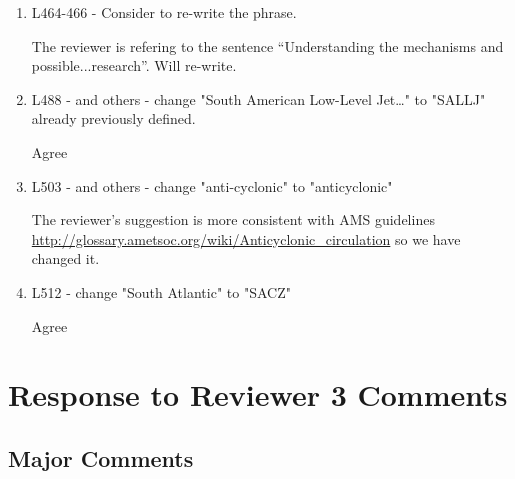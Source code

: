 \documentclass{article}
\newenvironment{answer}{\begin{mdframed}}{\end{mdframed}}
\begin{document}
\begin{enumerate}
	\item L464-466 - Consider to re-write the phrase.
	\begin{answer}
		The reviewer is refering to the sentence ``Understanding the mechanisms and possible...research''.
		Will re-write.
	\end{answer}
	\item L488 - and others - change "South American Low-Level Jet…" to "SALLJ" already previously defined.
	\begin{answer}
		Agree
	\end{answer}
	\item L503 - and others - change "anti-cyclonic" to "anticyclonic"
	\begin{answer}
		The reviewer's suggestion is more consistent with AMS guidelines \url{http://glossary.ametsoc.org/wiki/Anticyclonic_circulation} so we have changed it.
	\end{answer}
	\item L512 - change "South Atlantic" to "SACZ"
	\begin{answer}
		Agree
	\end{answer}
\end{enumerate}

\section{Response to Reviewer 3 Comments}

\subsection{Major Comments}
\end{document}
